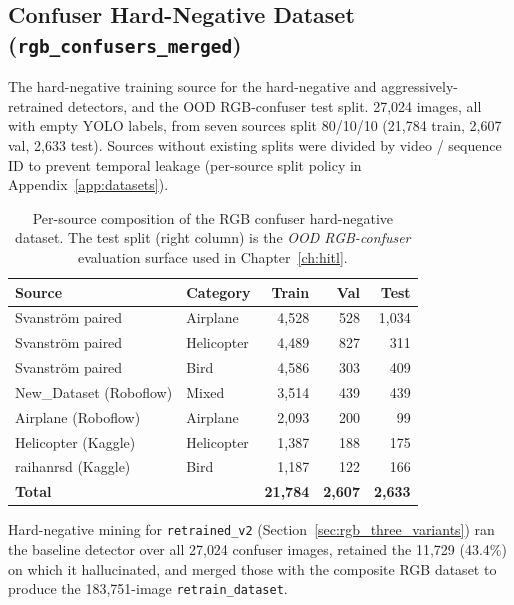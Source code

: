 \subsection[Confuser Hard-Negative Dataset]{Confuser Hard-Negative Dataset (\texttt{rgb\_confusers\allowbreak\_merged})}
\label{sec:ds_confusers}

The hard-negative training source for the hard-negative and aggressively-retrained detectors, and the OOD RGB-confuser test split. 27{,}024 images, all with empty YOLO labels, from seven sources split 80/10/10 (21{,}784 train, 2{,}607 val, 2{,}633 test). Sources without existing splits were divided by video / sequence ID to prevent temporal leakage (per-source split policy in Appendix~\ref{app:datasets}).

\begin{table}[htbp]
    \centering
    \caption{Per-source composition of the RGB confuser hard-negative dataset. The test split (right column) is the \emph{OOD RGB-confuser} evaluation surface used in Chapter~\ref{ch:hitl}.}
    \label{tab:ds_confusers}
    \begin{tabular}{llrrr}
        \toprule
        Source & Category & Train & Val & Test \\
        \midrule
        Svanstr\"om paired & Airplane    & 4{,}528 &   528 & 1{,}034 \\
        Svanstr\"om paired & Helicopter  & 4{,}489 &   827 &    311 \\
        Svanstr\"om paired & Bird        & 4{,}586 &   303 &    409 \\
        New\_Dataset (Roboflow) & Mixed  & 3{,}514 &   439 &    439 \\
        Airplane (Roboflow) & Airplane   & 2{,}093 &   200 &     99 \\
        Helicopter (Kaggle) & Helicopter & 1{,}387 &   188 &    175 \\
        raihanrsd (Kaggle) & Bird        & 1{,}187 &   122 &    166 \\
        \midrule
        \textbf{Total}     &             & \textbf{21{,}784} & \textbf{2{,}607} & \textbf{2{,}633} \\
        \bottomrule
    \end{tabular}
\end{table}

Hard-negative mining for \texttt{retrained\_v2} (Section~\ref{sec:rgb_three_variants}) ran the baseline detector over all 27{,}024 confuser images, retained the 11{,}729 (43.4\%) on which it hallucinated, and merged those with the composite RGB dataset to produce the 183{,}751-image \texttt{retrain\_dataset}.

